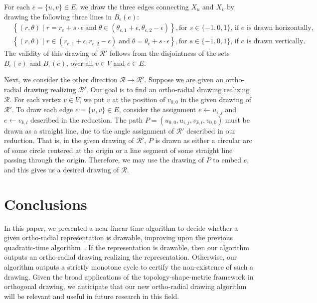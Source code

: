 \documentclass{article}\usepackage[a4paper,margin=20mm]{geometry}
\newcommand{\RR}{\mathcal{R}}
\begin{document}
For each $e=\{u,v\} \in E$, we draw the three edges connecting $X_u$ and $X_v$ by drawing the following three lines in $B_\epsilon(e)$:
\begin{align*}
    & \left\{ (r, \theta) \mid r= r_e +  s \cdot \epsilon \; \text{and} \; \theta \in (\theta_{e,1} + \epsilon, \theta_{e,2} - \epsilon)\right\}, \text{for $s \in \{-1, 0, 1\}$, if $e$ is drawn horizontally,}\\
    & \left\{ (r, \theta) \mid r\in(r_{e,1} + \epsilon, r_{e,2} - \epsilon) \; \text{and} \; \theta = \theta_e +  s \cdot \epsilon\right\},  \text{for $s \in \{-1, 0, 1\}$, if $e$ is drawn vertically.}
\end{align*}
The validity of this drawing of $\RR'$ follows from the disjointness of the sets $B_\epsilon(v)$ and $B_\epsilon(e)$, over all $v\in V$ and $e\in E$.
 
Next, we consider the other direction $\RR \rightarrow \RR'$.  Suppose we are given an ortho-radial drawing realizing $\RR'$. Our goal is to find an ortho-radial drawing realizing $\RR$. For each vertex $v \in V$, we put $v$ at the position of $v_{0,0}$ in the given drawing of $\RR'$. 
To draw each edge $e=\{u,v\} \in E$, consider the assignment $e \leftarrow u_{i,j}$ and  $e \leftarrow v_{k,l}$ described in the reduction. The path $P = (u_{0,0}, u_{i,j}, v_{k,l}, v_{0,0})$ must be drawn as a straight line, due to the angle assignment of $\RR'$ described in our reduction. That is, in the given drawing of $\RR'$, $P$ is drawn as either a circular arc of some circle centered
at the origin or a line segment of some straight line passing through the origin. Therefore, we may use the drawing of $P$ to embed $e$, and this gives us a desired drawing of $\RR$. 


\section{Conclusions}\label{sect:conclusions}

In this paper, we presented a near-linear time algorithm to decide whether a given ortho-radial representation is drawable, improving upon the previous quadratic-time algorithm~\cite{barth2023topology}. If the representation is drawable, then our algorithm outputs an ortho-radial drawing realizing the representation. Otherwise, our algorithm outputs a strictly monotone cycle to certify the non-existence of such a drawing. Given the broad applications of the topology-shape-metric framework in orthogonal drawing, we anticipate that our new ortho-radial drawing algorithm will be relevant and useful in future research in this field.
\end{document}
